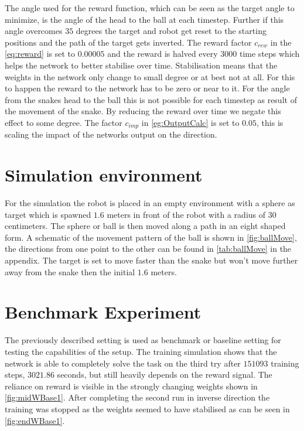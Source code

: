 The angle used for the reward function, which can be seen as the target angle to minimize, is the angle of the head to the ball at each timestep. Further if this angle overcomes $35$ degrees the target and robot get reset to the starting positions and the path of the target gets inverted.
The reward factor $c_{rew}$ in the \autoref{eq:reward} is set to $0.00005$ and the reward is halved every $3000$ time steps which helps the network to better stabilise over time. Stabilisation means that the weights in the network only change to small degree or at best not at all. For this to happen the reward to the network has to be zero or near to it. For the angle from the snakes head to the ball this is not possible for each timestep as result of the movement of the snake. By reducing the reward over time we negate this effect to some degree. The factor $c_{imp}$ in \autoref{eg:OutputCalc} is set to $0.05$, this is scaling the impact of the networks output on the direction. 

\section{Simulation environment}
For the simulation the robot is placed in an empty environment with a sphere as target which is spawned $1.6$ meters in front of the robot with a radius of $30$ centimeters. The sphere or ball is then moved along a path in an eight shaped form. A schematic of the movement pattern of the ball is shown in \autoref{fig:ballMove}, the directions from one point to the other can be found in \autoref{tab:ballMove} in the appendix.
The target is set to move faster than the snake but won’t move further away from the snake then the initial $1.6$ meters.


\section{Benchmark Experiment}
The previously described setting is used as benchmark or baseline setting for testing the capabilities of the setup. 
The training simulation shows that the network is able to completely solve the task on the third try after $151093$ training steps, $3021.86$ seconds, but still heavily depends on the reward signal. The reliance on reward is visible in the strongly changing weights shown in \autoref{fig:midWBase1}. After completing the second run in inverse direction the training was stopped as the weights seemed to have stabilised as can be seen in \autoref{fig:endWBase1}.

